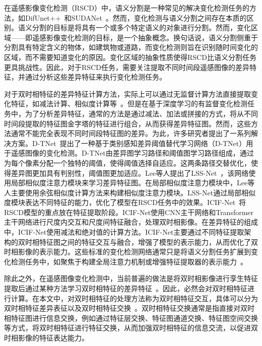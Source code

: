 在遥感影像变化检测（RSCD）中，语义分割是一种常见的解决变化检测任务的方法，如DifUnet++~\cite{x_zhang_difunet_2022}和SUDANet~\cite{Sun2022SUDANetAS}。然而，变化检测与语义分割之间存在本质的区别。语义分割的目标是将具有一个或多个特定语义的对象进行分割。然而，变化区域——即遥感影像变化检测的目标，是一个抽象概念。换句话说，语义分割侧重于分割具有特定含义的物体，如建筑物或道路，而变化检测则旨在识别随时间变化的区域，而不需要知道变化的原因。变化区域的抽象性质使得RSCD比语义分割任务更具挑战性。因此，对于RSCD任务，需要关注提取不同时间段遥感图像的差异特征，并通过分析这些差异特征来执行变化检测任务。

对于双时相特征的差异特征计算方法，实际上可以通过无监督计算方法直接提取变化特征，如减法计算、相似度计算等~\cite{Liu2022APM}。但是在基于深度学习的有监督变化检测任务中，为了分析差异特征，通常的方法是通过减法、加法或拼接的方式，将从不同时间段提取的特征图金字塔的特征进行组合，从而获得差异特征图。然而，这些方法通常不能完全表现不同时间段特征图的差异。为此，许多研究者提出了一系列解决方案。D-TNet~\cite{wan_d-tnet_2022-3}提出了一种基于类别感知差异阈值替代学习网络（D-TNet）用于遥感图像的变化检测。D-TNet由差异图学习路径和阈值图学习路径组成，通过为每个像素分配一个独特的阈值，使得阈值选择自适应。这两条路径交替优化，使得差异图更加具有判别性，阈值图更加适应。Lee等人提出了LSS-Net~\cite{Lee2021LocalSS}，该网络使用局部相似度注意力模块来学习差异特征图。在局部相似度注意力模块中，Lee等人主要使用余弦相似度计算方法来构建相似度注意力模块。LSS-Net通过局部相似度模块表达不同特征的能力，优化了模型在RSCD任务中的效果。ICIF-Net~\cite{Feng2022ICIFNetIC}将RSCD模型的重点放在特征提取阶段。ICIF-Net使用CNN主干网络和Transformer主干网络进行尺度内交互和尺度间特征融合，处理双时相影像。在差异特征的组成中，ICIF-Net使用减法和绝对值的计算方法。ICIF-Net主要通过不同特征提取架构的双时相特征图之间的特征交互与融合，增强了模型的表示能力，从而优化了双时相影像的表示能力。这些标准的变化检测网络通常只是将语义分割任务扩展到变化检测任务中，如聚焦于构建全局注意力机制或增强特征提取器的表示能力~\cite{Zheng2022HFANetHF}。

除此之外，在遥感图像变化检测中，当前普遍的做法是将双时相影像进行孪生特征提取后通过某种方法学习双时相特征的差异特征~\cite{CHXB201710028}。因此，必然会对双时相特征进行计算。在本文中，对双时相特征的处理方法称为双时相特征交互，具体可以分为双时相特征差异表征以及双时相特征交换~\cite{Fang2022ChangerFI,Lin2024DiFormerAD}。双时相特征交换通常是指直接对双时相特征图进行信息交换，例如通过特征层交换、特征图通道交换、特征图空间交换等方式，将双时相特征进行特征交换，从而加强双时相特征的信息交流，以促进双时相影像的特征表达能力。

